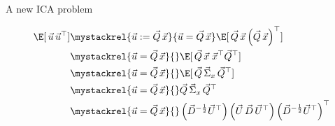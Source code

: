 \begin{frame}{A new ICA problem}


\begin{align}
\E \lbrack\, \vec u \, \vec u^\top \rbrack
&\mystackrel{\vec u := \vec Q\, \vec x}{\vec u = \vec Q\, \vec x}
 \E \lbrack\, \vec Q \, \vec x  \left( \vec Q \, \vec x\right)^\top \rbrack\\
&\mystackrel{\vec u = \vec Q\, \vec x}{}\E \lbrack\, \vec Q \, \vec x \; \vec x^\top \vec Q^\top \rbrack\\
&\mystackrel{\vec u = \vec Q\, \vec x}{} \E \lbrack\, \vec Q \, \vec \Sigma_{x} \, \vec Q^\top \rbrack\\
&\mystackrel{\vec u = \vec Q\, \vec x}{} \vec Q \, \vec \Sigma_{x} \, \vec Q^\top\\
&\mystackrel{\vec u = \vec Q\, \vec x}{}
\left( \vec D^{-\frac{1}{2}} \vec U^\top \right)
\left( \vec U \, \vec D \, \vec U^\top \right)
\left( \vec D^{-\frac{1}{2}} \vec U^\top \right)^\top
\end{align}

\end{frame}
